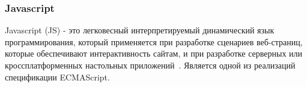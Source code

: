 \subsubsection{Javascript}

Javascript (JS) - это легковесный интерпретируемый динамический язык программирования, который применяется при разработке сценариев веб-страниц, которые обеспечивают интерактивность сайтам, и при разработке серверных или кроссплатформенных настольных приложений~\cite{JS}. Является одной из реализаций спецификации ECMAScript.


